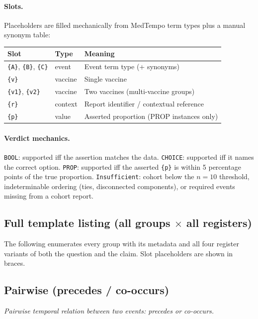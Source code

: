\documentclass[11pt]{article}
\begin{document}
\paragraph{Slots.} Placeholders are filled mechanically from MedTempo
term types plus a manual synonym table:
\begin{center}
\begin{tabular}{@{}lll@{}}
\toprule
\textbf{Slot} & \textbf{Type} & \textbf{Meaning} \\
\midrule
\texttt{\{A\}}, \texttt{\{B\}}, \texttt{\{C\}} & event   & Event term type (+ synonyms) \\
\texttt{\{v\}}                                 & vaccine & Single vaccine \\
\texttt{\{v1\}}, \texttt{\{v2\}}               & vaccine & Two vaccines (multi-vaccine groups) \\
\texttt{\{r\}}                                 & context & Report identifier / contextual reference \\
\texttt{\{p\}}                                 & value   & Asserted proportion (PROP instances only) \\
\bottomrule
\end{tabular}
\end{center}
\paragraph{Verdict mechanics.} \texttt{BOOL}: supported iff the assertion
matches the data. \texttt{CHOICE}: supported iff it names the correct option. \texttt{PROP}:
supported iff the asserted \texttt{\{p\}} is within 5 percentage points of the true
proportion. \texttt{Insufficient}: cohort below the $n=10$ threshold, indeterminable
ordering (ties, disconnected components), or required events missing from a cohort report.
\subsection*{}
\subsection{Full template listing (all groups $\times$ all registers)}
The following enumerates every group with its metadata and all four register
variants of both the question and the claim. Slot placeholders are shown in braces.
\subsection{Pairwise (precedes / co-occurs)}
\noindent\emph{Pairwise temporal relation between two events: precedes or co-occurs.}
\end{document}
